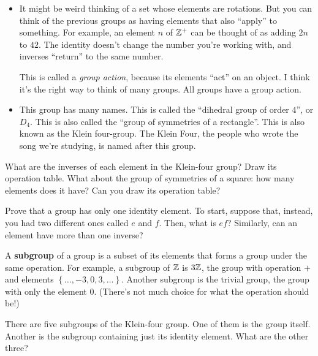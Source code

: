 \documentclass[11pt,paper=letter]{scrartcl}
\begin{document}
\begin{itemize}
  \begin{itemize}
    \item It might be weird thinking of a set whose elements are rotations. But you can think of the previous groups as having elements that also ``apply'' to something. For example, an element $n$ of $\mathbb Z^+$ can be thought of as adding $2n$ to $42$. The identity doesn't change the number you're working with, and inverses ``return'' to the same number.
    \begin{remboxed}
      This is called a \textit{group action}, because its elements ``act'' on an object. I think it's the right way to think of many groups. All groups have a group action.
    \end{remboxed}
    \item This group has many names. This is called the ``dihedral group of order $4$'', or $D_4$. This is also called the ``group of symmetries of a rectangle''. This is also known as the Klein four-group. The Klein Four, the people who wrote the song we're studying, is named after this group.
  \end{itemize}
  \begin{exrboxed}
    What are the inverses of each element in the Klein-four group? Draw its operation table. What about the group of symmetries of a square: how many elements does it have? Can you draw its operation table?
  \end{exrboxed}
\end{itemize}

\begin{exrboxed}
  Prove that a group has only one identity element. To start, suppose that, instead, you had two different ones called $e$ and $f$. Then, what is $ef$? Similarly, can an element have more than one inverse?
\end{exrboxed}

A \textbf{subgroup} of a group is a subset of its elements that forms a group under the same operation. For example, a subgroup of $\mathbb Z$ is $3\mathbb Z$, the group with operation $+$ and elements $ \left\{ \ldots,-3, 0, 3, \ldots \right\} $. Another subgroup is the trivial group, the group with only the element $0$. (There's not much choice for what the operation should be!)

\begin{exrboxed}
  There are five subgroups of the Klein-four group. One of them is the group itself. Another is the subgroup containing just its identity element. What are the other three?
\end{exrboxed}
\end{document}
